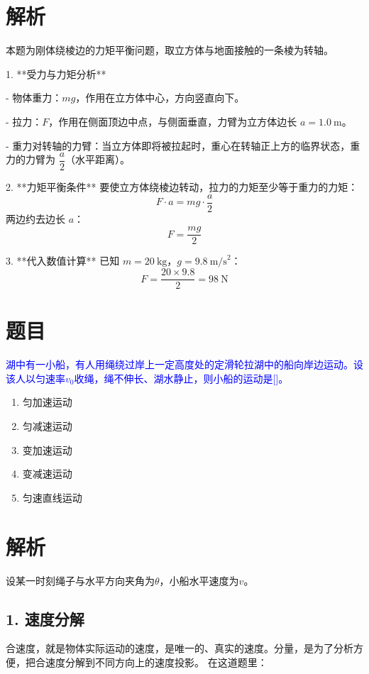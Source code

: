\documentclass[11pt,a4paper]{article}
\begin{document}
\section*{解析}

本题为刚体绕棱边的力矩平衡问题，取立方体与地面接触的一条棱为转轴。

1.  **受力与力矩分析**
    
- 物体重力：$mg$，作用在立方体中心，方向竖直向下。

- 拉力：$F$，作用在侧面顶边中点，与侧面垂直，力臂为立方体边长 $a=1.0\ \text{m}$。

- 重力对转轴的力臂：当立方体即将被拉起时，重心在转轴正上方的临界状态，重力的力臂为 $\dfrac{a}{2}$（水平距离）。

2.  **力矩平衡条件**
    要使立方体绕棱边转动，拉力的力矩至少等于重力的力矩：
    \[
    F \cdot a = mg \cdot \frac{a}{2}
    \]
    两边约去边长 $a$：
    \[
    F = \frac{mg}{2}
    \]

3.  **代入数值计算**
    已知 $m=20\ \text{kg}$，$g=9.8\ \text{m/s}^2$：
    \[
    F = \frac{20 \times 9.8}{2} = 98\ \text{N}
    \]


\section*{题目}
\textcolor{blue}{湖中有一小船，有人用绳绕过岸上一定高度处的定滑轮拉湖中的船向岸边运动。设该人以匀速率$v_0$收绳，绳不伸长、湖水静止，则小船的运动是[]。}

\begin{enumerate}
    \item[A] 匀加速运动
    \item[B] 匀减速运动
    \item[C] 变加速运动
    \item[D] 变减速运动
    \item[E] 匀速直线运动
\end{enumerate}

\section*{解析}
设某一时刻绳子与水平方向夹角为$\theta$，小船水平速度为$v$。

\subsection*{1. 速度分解}
合速度，就是物体实际运动的速度，是唯一的、真实的速度。分量，是为了分析方便，把合速度分解到不同方向上的速度投影。
在这道题里：
\end{document}
